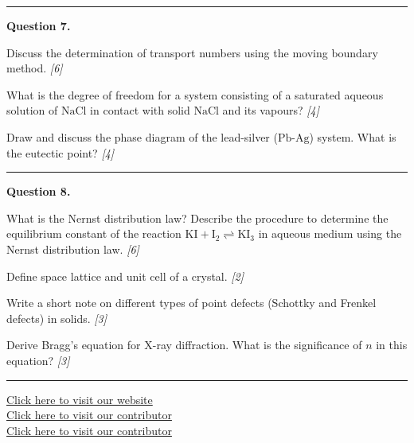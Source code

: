 \documentclass[11pt,a4paper]{article}
\newcommand{\pts}[1]{\hfill   \textit{[#1]}}
\begin{document}
\medskip\rule{\linewidth}{0.2pt}




\noindent   \textbf{Question 7.}

\begin{parts}
  \item Discuss the determination of transport numbers using the moving boundary method. \pts{6}
  \item What is the degree of freedom for a system consisting of a saturated aqueous solution of $ \text{NaCl}$ in contact with solid $ \text{NaCl}$ and its vapours? \pts{4}
  \item Draw and discuss the phase diagram of the lead-silver ($ \text{Pb-Ag}$) system. What is the eutectic point? \pts{4}
\end{parts}

\medskip\rule{\linewidth}{0.2pt}




\noindent   \textbf{Question 8.}

\begin{parts}
  \item What is the Nernst distribution law? Describe the procedure to determine the equilibrium constant of the reaction $ \text{KI} +  \text{I}_2 \rightleftharpoons  \text{KI}_3$ in aqueous medium using the Nernst distribution law. \pts{6}
  \item Define space lattice and unit cell of a crystal. \pts{2}
  \item Write a short note on different types of point defects (Schottky and Frenkel defects) in solids. \pts{3}
  \item Derive Bragg's equation for X-ray diffraction. What is the significance of $n$ in this equation? \pts{3}
\end{parts}

\vfill
\rule{\linewidth}{0.4pt}

\begin{center}\small
  \href{https://bhu-exam.vercel.app/}{Click here to visit our website}\\[4pt]
  \href{https://me-aryan.vercel.app/}{Click here to visit our contributor}\\[4pt]
  \href{https://quashan-me.vercel.app/}{Click here to visit our contributor}
\end{center}
\end{document}
